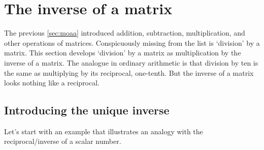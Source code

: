
\section{The inverse of a matrix}
\label{sec:im}
\secttoc

\begin{comment}
\pooliv{p.163--9}  \layiv{\S2.2--3}  \cite[\S3.2]{Nakos1998}  \cite[Ch.~6]{Chartier2015}
\end{comment}


The previous \autoref{sec:moaa} introduced addition, subtraction, multiplication, and other operations of matrices.  
Conspicuously missing from the list is `division' by a matrix.
This section develops `division' by a matrix as multiplication by the inverse of a matrix.
The analogue in ordinary arithmetic is that division by ten is the same as multiplying by its reciprocal, one-tenth.
But the inverse of a matrix looks nothing like a reciprocal.


\subsection{Introducing the unique inverse}

Let's start with an example that illustrates an analogy with the reciprocal\slash inverse of a scalar number.

